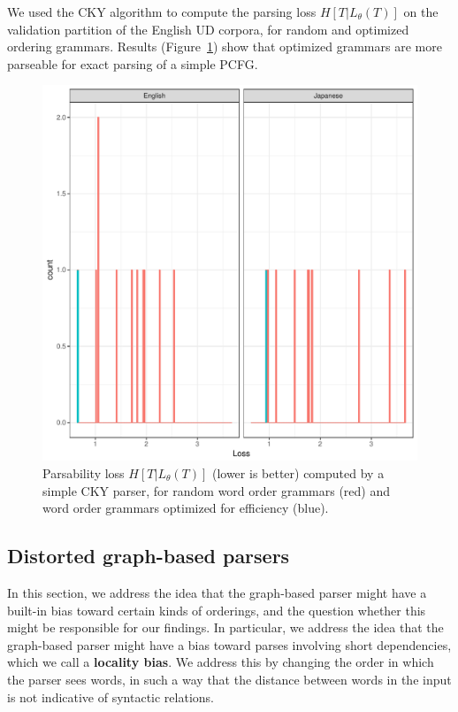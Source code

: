 \documentclass[10pt,twoside,lineno]{article}
\newcommand{\key}[1]{\textbf{#1}}
\begin{document}
We used the CKY algorithm to compute the parsing loss $H[T|L_\theta(T)]$ on the validation partition of the English UD corpora, for random and optimized ordering grammars.
Results (Figure~\ref{fig:cky-parser}) show that optimized grammars are more parseable for exact parsing of a simple PCFG.


\begin{figure}
    \centering
    \includegraphics[scale=.7]{../results/cky/cky-parse.pdf} 
	\caption{Parsability loss $H[T|L_\theta(T)]$ (lower is better) computed by a simple CKY parser, for random word order grammars (red) and word order grammars optimized for efficiency (blue).}
    \label{fig:cky-parser}
\end{figure}



\subsection{Distorted graph-based parsers}

In this section, we address the idea that the graph-based parser might have a built-in bias toward certain kinds of orderings, and the question whether this might be responsible for our findings.
In particular, we address the idea that the graph-based parser might have a bias toward parses involving short dependencies, which we call a \key{locality bias}. 
We address this by changing the order in which the parser sees words, in such a way that the distance between words in the input is not indicative of syntactic relations.
\end{document}
